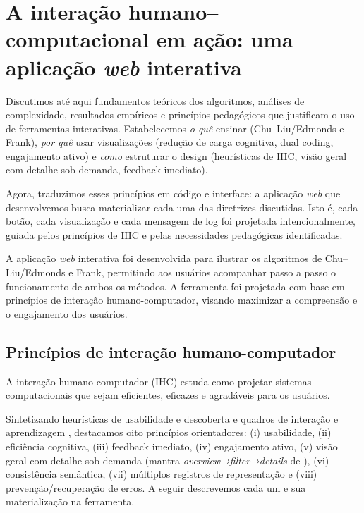 \chapter{A interação humano--computacional em ação: uma aplicação \textit{web} interativa}


Discutimos até aqui fundamentos teóricos dos algoritmos, análises de complexidade, resultados empíricos e princípios pedagógicos que justificam o uso de ferramentas interativas. Estabelecemos \emph{o quê} ensinar (Chu–Liu/Edmonds e Frank), \emph{por quê} usar visualizações (redução de carga cognitiva, dual coding, engajamento ativo) e \emph{como} estruturar o design (heurísticas de IHC, visão geral com detalhe sob demanda, feedback imediato).


Agora, traduzimos esses princípios em código e interface: a aplicação \textit{web} que desenvolvemos busca materializar cada uma das diretrizes discutidas. Isto é, cada botão, cada visualização e cada mensagem de log foi projetada intencionalmente, guiada pelos princípios de IHC e pelas necessidades pedagógicas identificadas.


A aplicação \textit{web} interativa foi desenvolvida para ilustrar os algoritmos de Chu–Liu/Edmonds e Frank, permitindo aos usuários acompanhar passo a passo o funcionamento de ambos os métodos. A ferramenta foi projetada com base em princípios de interação humano-computador, visando maximizar a compreensão e o engajamento dos usuários.

\section{Princípios de interação humano-computador}


A interação humano-computador (IHC) estuda como projetar sistemas computacionais que sejam eficientes, eficazes e agradáveis para os usuários.


Sintetizando heurísticas de usabilidade e descoberta \cite{nielsen1994heuristics,shneiderman2016designing} e quadros de interação e aprendizagem \cite{rogers2011interaction,mayer2009multimedia,sweller1988cognitive,naps2003engagement}, destacamos oito princípios orientadores: (i) usabilidade, (ii) eficiência cognitiva, (iii) feedback imediato, (iv) engajamento ativo, (v) visão geral com detalhe sob demanda (mantra \emph{overview→filter→details} de \cite{shneiderman1996eyes}), (vi) consistência semântica, (vii) múltiplos registros de representação e (viii) prevenção/recuperação de erros. A seguir descrevemos cada um e sua materialização na ferramenta.


